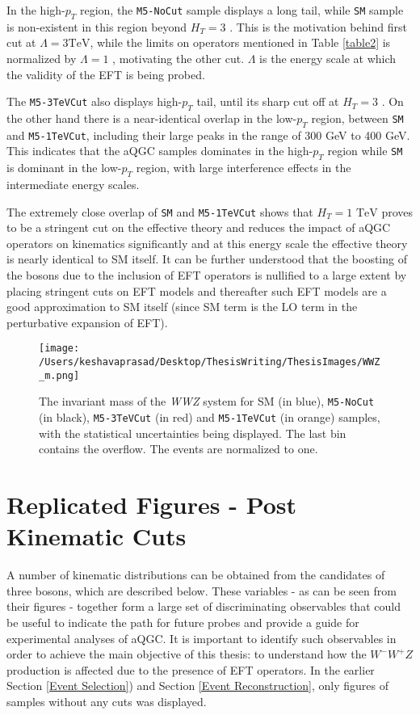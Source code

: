 In the high-$p_{T}$ region, the \texttt{M5-NoCut} sample displays a long tail, while \texttt{SM} sample is non-existent in this region beyond $H_{T} = 3 $  . This is the motivation behind first cut at $\Lambda= 3  \text{TeV}$, while the limits on operators mentioned in Table \ref{table2} is normalized by $\Lambda= 1 $ , motivating the other cut. $\Lambda$ is the energy scale at which the validity of the EFT is being probed.

The \texttt{M5-3TeVCut} also displays high-$p_{T}$ tail, until its sharp cut off at $H_{T} = 3 $ . On the other hand there is a near-identical overlap in the low-$p_{T}$ region, between \texttt{SM} and \texttt{M5-1TeVCut}, including their large peaks in the range of 300 GeV to 400 GeV. This indicates that the aQGC samples dominates in the high-$p_{T}$ region while \texttt{SM} is dominant in the low-$p_{T}$ region, with large interference effects in the intermediate energy scales.

The extremely close overlap of  \texttt{SM} and \texttt{M5-1TeVCut} shows that $H_{T} = 1 \text{ TeV}$ proves to be a stringent cut on the effective theory and reduces the impact of aQGC operators on kinematics significantly and at this energy scale the effective theory is nearly identical to SM itself. It can be further understood that the boosting of the bosons due to the inclusion of EFT operators is nullified to a large extent by placing stringent cuts on EFT models and thereafter such EFT models are a good approximation to SM itself (since SM term is the LO term in the perturbative expansion of EFT).

\begin{figure}[!htb]
	\centering
	\texttt{[image: /Users/keshavaprasad/Desktop/ThesisWriting/ThesisImages/WWZ\_m.png]}
	\caption{The invariant mass of the \textit{WWZ} system for SM (in blue), \texttt{M5-NoCut} (in black), \texttt{M5-3TeVCut} (in red) and \texttt{M5-1TeVCut} (in orange) samples, with the statistical uncertainties being displayed. The last bin contains the overflow. The events are normalized to one.}
	\label{InvMass-WWZ}
\end{figure}

\section{Replicated Figures - Post Kinematic Cuts}\label{Kinematic Distributions}

A number of kinematic distributions can be obtained from the candidates of three bosons, which are described below. These variables - as can be seen from their figures - together form a large set of discriminating observables that could be useful to indicate the path for future probes and provide a guide for experimental analyses of aQGC. It is important to identify such observables in order to achieve the main objective of this thesis: to understand how the $W^{-}W^{+}Z$ production is affected due to the presence of EFT operators. In the earlier Section \ref{Event Selection}) and Section \ref{Event Reconstruction}, only figures of samples without any cuts was displayed. 

